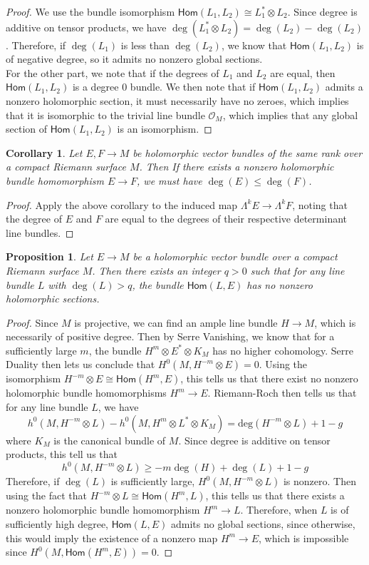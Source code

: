 \documentclass[psamsfonts, 12pt]{amsart}
\newtheorem{cor}[thm]{Corollary}
\newtheorem{prop}[thm]{Proposition}
\theoremstyle{definition}
\theoremstyle{remark}
\renewcommand{\hom}{\mathsf{Hom}}
\renewcommand{\O}{\mathcal{O}}
\begin{document}
%
\begin{proof}
We use the bundle isomorphism $\hom(L_1,L_2) \cong L_1^* \otimes L_2$. Since
degree is additive on tensor products, we have
$\deg(L_1^* \otimes L_2) = \deg(L_2) - \deg(L_2)$. Therefore, if
$\deg(L_1)$ is less than $\deg(L_2)$, we know that $\hom(L_1,L_2)$ is of negative
degree, so it admits no nonzero global sections. \\

For the other part, we note that if the degrees of $L_1$ and $L_2$ are equal,
then $\hom(L_1,L_2)$ is a degree $0$ bundle. We then note that if $\hom(L_1,L_2)$
admits a nonzero holomorphic section, it must necessarily have no zeroes,
which implies that it is isomorphic to the trivial line bundle $\O_M$, which
implies that any global section of $\hom(L_1,L_2)$ is an isomorphism.
\end{proof}
%
\begin{cor}
Let $E,F \to M$ be holomorphic vector bundles of the same rank over a compact Riemann
surface $M$. Then If there exists a nonzero holomorphic bundle homomorphism $E \to F$,
we must have $\deg(E) \leq \deg(F)$.
\end{cor}
%
\begin{proof}
Apply the above corollary to the induced map $\Lambda^k E \to \Lambda^kF$, noting
that the degree of $E$ and $F$ are equal to the degrees of their respective
determinant line bundles.
\end{proof}
%
\begin{prop}
Let $E \to M$ be a holomorphic vector bundle over a compact Riemann surface $M$.
Then there exists an integer $q > 0$ such that for any line bundle $L$
with $\deg(L) > q$, the bundle $\hom(L,E)$ has no nonzero holomorphic sections.
\end{prop}
%
\begin{proof}
Since $M$ is projective, we can find an ample line bundle $H \to M$, which is
necessarily of positive degree. Then by Serre Vanishing, we know that for
a sufficiently large $m$, the bundle $H^m \otimes E^* \otimes K_M$ has no higher
cohomology. Serre Duality then lets us conclude that $H^0(M,H^{-m}\otimes E) = 0$.
Using the isomorphism $H^{-m}\otimes E \cong \hom(H^m, E)$, this tells us that there
exist no nonzero holomorphic bundle homomorphisms $H^m \to E$. Riemann-Roch then
tells us that for any line bundle $L$, we have
\[
h^0(M,H^{-m} \otimes L) - h^0(M, H^m \otimes L^*\otimes K_M)
= \mathrm{deg}(H^{-m} \otimes L) + 1 - g
\]
where $K_M$ is the canonical bundle of $M$. Since degree is additive on tensor
products, this tell us that
\[
h^0(M,H^{-m}\otimes L) \geq -m\deg(H) + \deg(L) + 1 - g
\]
Therefore, if $\deg(L)$ is sufficiently large, $H^0(M,H^{-m}\otimes L)$ is nonzero.
Then using the fact that $H^{-m} \otimes L \cong \hom(H^m, L)$, this tells us
that there exists a nonzero holomorphic bundle homomorphism $H^m \to L$. Therefore,
when $L$ is of sufficiently high degree, $\hom(L, E)$ admits no global sections,
since otherwise, this would imply the existence of a nonzero map
$H^m \to E$, which is impossible since $H^0(M,\hom(H^m,E)) = 0$.
\end{proof}
\end{document}
